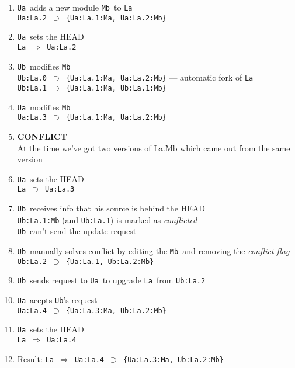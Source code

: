\documentclass[10pt]{article}
\def\Ua{{\tt Ua}}
\def\Ub{{\tt Ub}}
\def\La{{\tt La}}
\def\Mb{{\tt Mb}}
\def\headsto{${\Longrightarrow}$ }
\def\hto{\headsto}
\def\eq{${\supset}$ }
\begin{document}
		\begin{enumerate}
			\item{\Ua\ adds a new module \Mb\ to \La\\
            		{\tt Ua:La.2 \eq \{Ua:La.1:Ma, Ua:La.2:Mb\}}
			}
			\item{\Ua\ sets the HEAD\\
				{\tt La \hto Ua:La.2}
			}
			\item{\Ub\ modifies \Mb\\
				{\tt Ub:La.0 \eq \{Ua:La.1:Ma, Ua:La.2:Mb\}} --- automatic fork of \La\\
				{\tt Ub:La.1 \eq \{Ua:La.1:Ma, Ub:La.1:Mb\}}
			}
			\item{\Ua\ modifies \Mb\\
				{\tt Ua:La.3 \eq \{Ua:La.1:Ma, Ua:La.2:Mb\}}
			}
			\item{{\bf CONFLICT}\\
            		At the time we've got two versions of La.Mb which came out from the same version
            	}
            	\item{\Ua\ sets the HEAD\\
            		{\tt La \eq Ua:La.3}
            	}
            	\item{\Ub\ receives info that his source is behind the HEAD\\
				{\tt Ub:La.1:Mb} (and {\tt Ub:La.1}) is marked as {\em conflicted}\\
				\Ub\ can't send the update request
			}
			\item{\Ub\ manually solves conflict by editing the \Mb\ and removing the {\em conflict flag}\\
				{\tt Ub:La.2 \eq \{Ua:La.1, Ub:La.2:Mb\}}
			}
			\item{\Ub\ sends request to \Ua\ to upgrade \La\ from {\tt Ub:La.2}}
			\item{\Ua\ acepts \Ub's request\\
				{\tt Ua:La.4 \eq \{Ua:La.3:Ma, Ub:La.2:Mb\}}
			}
			\item{\Ua\ sets the HEAD\\
				{\tt La \hto Ua:La.4}
			}
			\item{Result: {\tt La \hto Ua:La.4 \eq \{Ua:La.3:Ma, Ub:La.2:Mb\}}}
		\end{enumerate}
		
\end{document}
